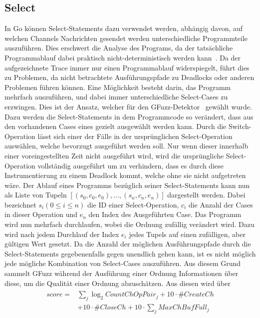 \subsection{Select}\label{Chap:Back-Sec:Select}
In Go können Select-Statements dazu verwendet werden, abhängig davon, 
auf welchen Channels Nachrichten gesendet werden unterschiedliche Programmteile
auszuführen. Dies erschwert die Analyse des Programs, da der 
tatsächliche Programmablauf dabei praktisch nicht-deterministisch werden 
kann~\cite{select-spec}. Da der aufgezeichnete Trace immer nur einen 
Programmablauf widerspiegelt, führt dies zu Problemen, da 
nicht betrachtete Ausführungspfade zu Deadlocks oder anderen Problemen 
führen können. Eine Möglichkeit besteht darin, das Programm mehrfach auszuführen, 
und dabei immer unterschiedliche Select-Cases zu erzwingen. Dies ist der Ansatz,
welcher für den GFuzz-Detektor~\cite{gfuzz} gewählt wurde. Dazu werden die 
Select-Statements in dem Programmcode so verändert, dass aus den vorhandenen 
Cases eines gezielt ausgewählt werden kann.
Durch die Switch-Operation lässt sich einer der Fälle in der ursprünglichen 
Select-Operation auswählen, welche bevorzugt ausgeführt werden soll. Nur 
wenn dieser innerhalb einer voreingestellten Zeit nicht ausgeführt wird, 
wird die ursprüngliche Select-Operation vollständig ausgeführt um zu verhindern, 
dass es durch diese Instrumentierung zu einem Deadlock kommt, welche ohne 
sie nicht aufgetreten wäre. Der Ablauf eines Programms bezüglich seiner 
Select-Statements kann nun als Liste von Tupeln 
$[(s_0, c_0, e_0), \ldots, (s_n, c_n, e_n)]$ dargestellt werden. Dabei 
bezeichnet $s_i (0 \leq i \leq n)$ die ID einer Select-Operation, $c_i$ 
die Anzahl der Cases in dieser Operation und $e_n$ den Index des Ausgeführten 
Case. Das Programm wird nun mehrfach durchlaufen, wobei die Ordnung zufällig 
verändert wird. Dazu wird nach jedem Durchlauf der Index $e_i$ jedes Tupels 
auf einen zufälligen, aber gültigen Wert gesetzt. Da die Anzahl der möglichen 
Ausführungspfade durch die Select-Statements gegebenenfalls gegen unendlich gehen kann,
ist es nicht möglich jede mögliche Kombination von Select-Cases auszuführen.
Aus diesem Grund sammelt GFuzz während der Ausführung einer Ordnung Informationen 
über diese, um die Qualität einer Ordnung abzuschätzen. Aus diesen wird 
über 
\begin{align}
  \begin{split}
    score = &\sum_j \log_2{CountChOpPair_j} + 10 \cdot \# CreateCh \\
            &+ 10 \cdot \#CloseCh + 10 \cdot \sum_j MaxChBufFull_j
  \end{split}
\end{align}
